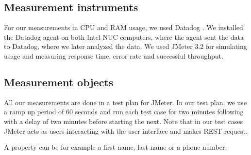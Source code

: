 \documentclass[a4paper,oneside]{bth}
\begin{document}
\subsection{Measurement instruments}

For our measurements in CPU and RAM usage, we used Datadog \cite{Datadog}. We installed the Datadog agent on both Intel NUC computers, where the agent sent the data to Datadog, where we later analyzed the data. We used JMeter 3.2 \cite{JMeter} for simulating usage and measuring response time, error rate and
successful throughput.

\subsection{Measurement objects} \label{measurementObjects}

All our measurements are done in a test plan for JMeter. In our test plan, we use a ramp up period of 60 seconds and run each test case for two minutes following with  a delay of two minutes before starting the next. Note that in our test cases JMeter acts as users interacting with the user interface and makes REST request.

A property can be for example a first name, last name or a phone number.
\end{document}
